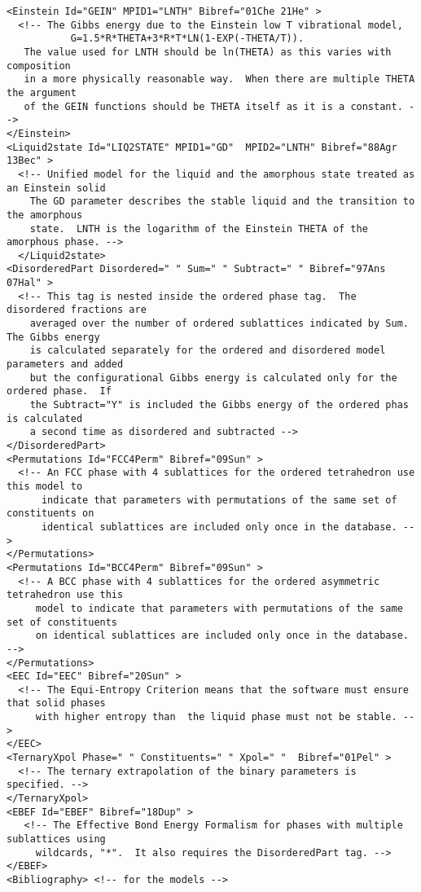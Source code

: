 \documentclass[preprint,review,12pt]{elsarticle}
\begin{document}
\begin{appendix}
{\small
\begin{verbatim}
<Einstein Id="GEIN" MPID1="LNTH" Bibref="01Che 21He" > 
  <!-- The Gibbs energy due to the Einstein low T vibrational model, 
           G=1.5*R*THETA+3*R*T*LN(1-EXP(-THETA/T)).
   The value used for LNTH should be ln(THETA) as this varies with composition
   in a more physically reasonable way.  When there are multiple THETA the argument
   of the GEIN functions should be THETA itself as it is a constant. -->
</Einstein>
<Liquid2state Id="LIQ2STATE" MPID1="GD"  MPID2="LNTH" Bibref="88Agr 13Bec" > 
  <!-- Unified model for the liquid and the amorphous state treated as an Einstein solid
    The GD parameter describes the stable liquid and the transition to the amorphous
    state.  LNTH is the logarithm of the Einstein THETA of the amorphous phase. -->
  </Liquid2state>
<DisorderedPart Disordered=" " Sum=" " Subtract=" " Bibref="97Ans 07Hal" > 
  <!-- This tag is nested inside the ordered phase tag.  The disordered fractions are 
    averaged over the number of ordered sublattices indicated by Sum.  The Gibbs energy
    is calculated separately for the ordered and disordered model parameters and added
    but the configurational Gibbs energy is calculated only for the ordered phase.  If 
    the Subtract="Y" is included the Gibbs energy of the ordered phas is calculated 
    a second time as disordered and subtracted -->
</DisorderedPart>
<Permutations Id="FCC4Perm" Bibref="09Sun" > 
  <!-- An FCC phase with 4 sublattices for the ordered tetrahedron use this model to
      indicate that parameters with permutations of the same set of constituents on
      identical sublattices are included only once in the database. -->
</Permutations>
<Permutations Id="BCC4Perm" Bibref="09Sun" > 
  <!-- A BCC phase with 4 sublattices for the ordered asymmetric tetrahedron use this
     model to indicate that parameters with permutations of the same set of constituents
     on identical sublattices are included only once in the database. -->
</Permutations>
<EEC Id="EEC" Bibref="20Sun" > 
  <!-- The Equi-Entropy Criterion means that the software must ensure that solid phases
     with higher entropy than  the liquid phase must not be stable. -->
</EEC>
<TernaryXpol Phase=" " Constituents=" " Xpol=" "  Bibref="01Pel" > 
  <!-- The ternary extrapolation of the binary parameters is specified. -->
</TernaryXpol>
<EBEF Id="EBEF" Bibref="18Dup" > 
   <!-- The Effective Bond Energy Formalism for phases with multiple sublattices using 
     wildcards, "*".  It also requires the DisorderedPart tag. -->
</EBEF>
<Bibliography> <!-- for the models -->

\end{verbatim}}
\end{appendix}
\end{document}
